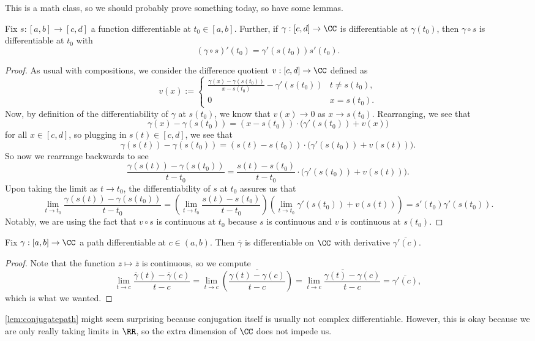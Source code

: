 This is a math class, so we should probably prove something today, so have some lemmas.
\begin{lemma} \label{lem:reparameterize}
	Fix $s:[a,b]\to[c,d]$ a function differentiable at $t_0\in[a,b]$. Further, if $\gamma:[c,d]\to\CC$ is differentiable at $\gamma(t_0)$, then $\gamma\circ s$ is differentiable at $t_0$ with
	\[(\gamma\circ s)'(t_0)=\gamma'(s(t_0))s'(t_0).\]
\end{lemma}
\begin{proof}
	As usual with compositions, we consider the difference quotient $v:[c,d]\to\CC$ defined as
	\[v(x):=\begin{cases}
		\frac{\gamma(x)-\gamma(s(t_0))}{x-s(t_0)}-\gamma'(s(t_0)) & t\ne s(t_0), \\
		0 & x=s(t_0).
	\end{cases}\]
	Now, by definition of the differentiability of $\gamma$ at $s(t_0)$, we know that $v(x)\to0$ as $x\to s(t_0)$. Rearranging, we see that
	\[\gamma(x)-\gamma(s(t_0))=(x-s(t_0))\cdot\big(\gamma'(s(t_0))+v(x)\big)\]
	for all $x\in [c,d]$, so plugging in $s(t)\in[c,d]$, we see that
	\[\gamma(s(t))-\gamma(s(t_0))=(s(t)-s(t_0))\cdot\big(\gamma'(s(t_0))+v(s(t))\big).\]
	So now we rearrange backwards to see
	\[\frac{\gamma(s(t))-\gamma(s(t_0))}{t-t_0}=\frac{s(t)-s(t_0)}{t-t_0}\cdot\big(\gamma'(s(t_0))+v(s(t))\big).\]
	Upon taking the limit as $t\to t_0$, the differentiability of $s$ at $t_0$ assures us that
	\[\lim_{t\to t_0}\frac{\gamma(s(t))-\gamma(s(t_0))}{t-t_0}=\left(\lim_{t\to t_0}\frac{s(t)-s(t_0)}{t-t_0}\right)\left(\lim_{t\to t_0}\gamma'(s(t_0))+v(s(t))\right)=s'(t_0)\gamma'(s(t_0)).\]
	Notably, we are using the fact that $v\circ s$ is continuous at $t_0$ because $s$ is continuous and $v$ is continuous at $s(t_0)$.
\end{proof}
\begin{lemma} \label{lem:conjugatepath}
	Fix $\gamma:[a,b]\to\CC$ a path differentiable at $c\in(a,b)$. Then $\overline{\gamma}$ is differentiable on $\CC$ with derivative $\overline{\gamma'(c)}$.
\end{lemma}
\begin{proof}
	Note that the function $z\mapsto\overline z$ is continuous, so we compute
	\[\lim_{t\to c}\frac{\overline\gamma(t)-\overline\gamma(c)}{t-c}=\lim_{t\to c}\overline{\left(\frac{\gamma(t)-\gamma(c)}{t-c}\right)}=\overline{\lim_{t\to c}\frac{\gamma(t)-\gamma(c)}{t-c}}=\overline{\gamma'(c)},\]
	which is what we wanted.
\end{proof}
\begin{remark}
	\autoref{lem:conjugatepath} might seem surprising because conjugation itself is usually not complex differentiable. However, this is okay because we are only really taking limits in $\RR$, so the extra dimension of $\CC$ does not impede us.
\end{remark}
